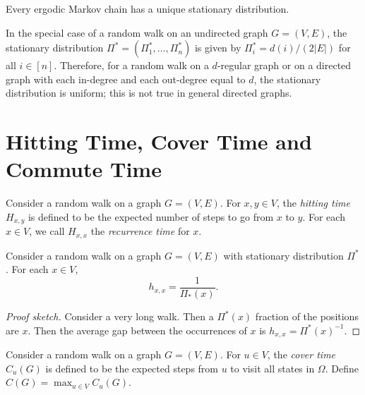 \documentclass[letterpaper, reqno,11pt]{article}
\begin{document}
\begin{theorem}
  Every ergodic Markov chain has a unique stationary distribution.
\end{theorem}

In the special case of a random walk on an undirected graph $G = (V, E)$, the stationary distribution $\Pi^* = (\Pi_1^*, \ldots, \Pi_n^*)$ is given by $\Pi_i^* = d(i)/(2|E|)$ for all $i \in [n]$. Therefore, for a random walk on a $d$-regular graph or on a directed graph with each in-degree and each out-degree equal to $d$, the stationary distribution is uniform; this is not true in general directed graphs.

\section{Hitting Time, Cover Time and Commute Time}

\begin{definition}
  Consider a random walk on a graph $G = (V, E)$. For $x, y \in V$, the \emph{hitting time} $H_{x, y}$ is defined to be the expected number of steps to go from $x$ to $y$. For each $x \in V$, we call $H_{x, x}$ the \emph{recurrence time} for $x$.
\end{definition}

\begin{theorem}
  Consider a random walk on a graph $G = (V, E)$ with stationary distribution $\Pi^*$. For each $x \in V$,
  $$ h_{x, x} = \frac{1}{\Pi_*(x)}. $$
\end{theorem}

\begin{proof}[Proof sketch]
  Consider a very long walk. Then a $\Pi^*(x)$ fraction of the positions are $x$. Then the average gap between the occurrences of $x$ is $h_{x, x} = \Pi^*(x)^{-1}$.
\end{proof}

\begin{definition}
  Consider a random walk on a graph $G = (V, E)$. For $u \in V$, the \emph{cover time} $C_u(G)$ is defined to be the expected steps from $u$ to visit all states in $\Omega$. Define $C(G) = \max_{u \in V} C_u(G)$.
\end{definition}
\end{document}
